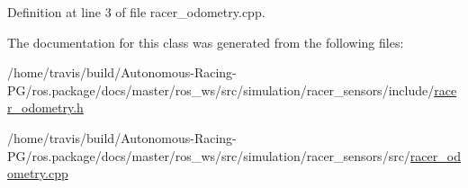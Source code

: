 Definition at line 3 of file racer\+\_\+odometry.\+cpp.



The documentation for this class was generated from the following files\+:\begin{DoxyCompactItemize}
\item 
/home/travis/build/\+Autonomous-\/\+Racing-\/\+P\+G/ros.\+package/docs/master/ros\+\_\+ws/src/simulation/racer\+\_\+sensors/include/\hyperlink{racer__odometry_8h}{racer\+\_\+odometry.\+h}\item 
/home/travis/build/\+Autonomous-\/\+Racing-\/\+P\+G/ros.\+package/docs/master/ros\+\_\+ws/src/simulation/racer\+\_\+sensors/src/\hyperlink{racer__odometry_8cpp}{racer\+\_\+odometry.\+cpp}\end{DoxyCompactItemize}
